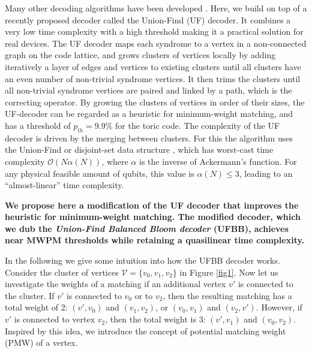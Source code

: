 \documentclass[11pt, a4paper, twoside, titlepage ,dvipsnames]{report}
\begin{document}
Many other decoding algorithms have been developed \cites{fowler2013minimum, duclos2013fault, hutter2015improved, watson2015fast, tuckett2018ultrahigh, kubica2019cellular, torlai2017neural, varsamopoulos2017decoding}. Here, we build on top of a recently proposed decoder called the Union-Find (UF) decoder. It combines a very low time complexity with a high threshold \cite{delfosse2017linear, delfosse2017almost} making it a practical solution for real devices. 
The UF decoder maps each syndrome to a vertex in a non-connected graph on the code lattice, and grows clusters of vertices locally by adding iteratively a layer of edges and vertices to existing clusters until 
all clusters have an even number of non-trivial syndrome vertices. It then trims the clusters until all non-trivial syndrome vertices are paired and linked by a path, which is the correcting operator. 
By growing the clusters of vertices in order of their sizes, the UF-decoder can be regarded as a heuristic for minimum-weight matching, and has a threshold of $p_{th} = 9.9\%$ for the toric code. 
The complexity of the UF decoder is driven by the merging between clusters. For this the algorithm uses the Union-Find or disjoint-set data structure \cite{tarjan1975efficiency}, which has worst-cast time complexity $\mathcal{O}(N\alpha(N))$, where $\alpha$ is the inverse of Ackermann's function. For any physical feasible amount of qubits, this value is $\alpha(N) \leq 3$, leading to an ``almost-linear'' time complexity.

\textbf{We propose here a modification of the UF decoder that improves the heuristic for minimum-weight matching. The modified decoder, which we dub the \emph{Union-Find Balanced Bloom decoder} (UFBB), achieves near MWPM thresholds while retaining a quasilinear time complexity.}

In the following we give some intuition into how the UFBB decoder works. Consider the cluster of vertices $\mathcal{V}=\{v_0,v_1,v_2\}$ in Figure \ref{fig1}. Now let us investigate the weights of a matching if an additional vertex $v'$ is connected to the cluster. 
If $v'$ is connected to $v_0$ or to $v_2$, then the resulting matching has a total weight of 2: $(v',v_0)$ and $(v_1,v_2)$, or $(v_0,v_1)$ and $(v_2,v')$. However, if $v'$ is connected to vertex $v_2$, then the total weight is 3: $(v', v_1)$ and $(v_0, v_2)$. Inspired by this idea, we introduce the concept of potential matching weight (PMW) of a vertex. 
\end{document}
